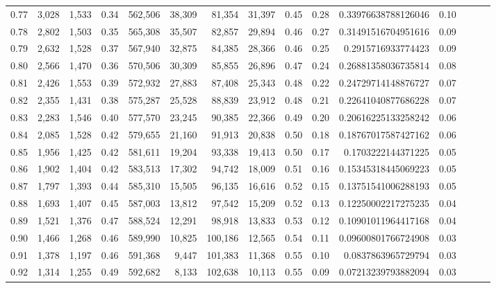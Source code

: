 \begin{tabular}{rrrrrrrrrrrrrrr}
0.77 &   3,028 &  1,533 &  0.34 &  562,506 &   38,309 &   81,354 &   31,397 &  0.45 &  0.28 &   0.33976638788126046 &      0.10 \\
0.78 &   2,802 &  1,503 &  0.35 &  565,308 &   35,507 &   82,857 &   29,894 &  0.46 &  0.27 &   0.31491516704951616 &      0.09 \\
0.79 &   2,632 &  1,528 &  0.37 &  567,940 &   32,875 &   84,385 &   28,366 &  0.46 &  0.25 &    0.2915716933774423 &      0.09 \\
0.80 &   2,566 &  1,470 &  0.36 &  570,506 &   30,309 &   85,855 &   26,896 &  0.47 &  0.24 &   0.26881358036735814 &      0.08 \\
0.81 &   2,426 &  1,553 &  0.39 &  572,932 &   27,883 &   87,408 &   25,343 &  0.48 &  0.22 &   0.24729714148876727 &      0.07 \\
0.82 &   2,355 &  1,431 &  0.38 &  575,287 &   25,528 &   88,839 &   23,912 &  0.48 &  0.21 &   0.22641040877686228 &      0.07 \\
0.83 &   2,283 &  1,546 &  0.40 &  577,570 &   23,245 &   90,385 &   22,366 &  0.49 &  0.20 &   0.20616225133258242 &      0.06 \\
0.84 &   2,085 &  1,528 &  0.42 &  579,655 &   21,160 &   91,913 &   20,838 &  0.50 &  0.18 &   0.18767017587427162 &      0.06 \\
0.85 &   1,956 &  1,425 &  0.42 &  581,611 &   19,204 &   93,338 &   19,413 &  0.50 &  0.17 &    0.1703222144371225 &      0.05 \\
0.86 &   1,902 &  1,404 &  0.42 &  583,513 &   17,302 &   94,742 &   18,009 &  0.51 &  0.16 &   0.15345318445069223 &      0.05 \\
0.87 &   1,797 &  1,393 &  0.44 &  585,310 &   15,505 &   96,135 &   16,616 &  0.52 &  0.15 &   0.13751541006288193 &      0.05 \\
0.88 &   1,693 &  1,407 &  0.45 &  587,003 &   13,812 &   97,542 &   15,209 &  0.52 &  0.13 &   0.12250002217275235 &      0.04 \\
0.89 &   1,521 &  1,376 &  0.47 &  588,524 &   12,291 &   98,918 &   13,833 &  0.53 &  0.12 &   0.10901011964417168 &      0.04 \\
0.90 &   1,466 &  1,268 &  0.46 &  589,990 &   10,825 &  100,186 &   12,565 &  0.54 &  0.11 &   0.09600801766724908 &      0.03 \\
0.91 &   1,378 &  1,197 &  0.46 &  591,368 &    9,447 &  101,383 &   11,368 &  0.55 &  0.10 &    0.0837863965729794 &      0.03 \\
0.92 &   1,314 &  1,255 &  0.49 &  592,682 &    8,133 &  102,638 &   10,113 &  0.55 &  0.09 &   0.07213239793882094 &      0.03 \\

\end{tabular}
